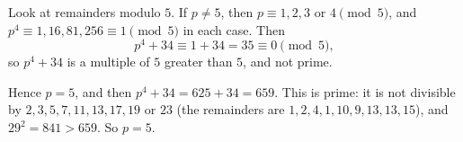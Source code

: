 Look at remainders modulo $5$. If $p\ne5$, then $p\equiv1,2,3$ or $4\pmod5$, and $p^4\equiv1,16,81,256\equiv1\pmod5$ in each case. Then
\[p^4+34\equiv1+34=35\equiv0\pmod5,\]
so $p^4+34$ is a multiple of $5$ greater than $5$, and not prime.

Hence $p=5$, and then $p^4+34=625+34=659$. This is prime: it is not divisible by $2,3,5,7,11,13,17,19$ or $23$ (the remainders are $1,2,4,1,10,9,13,13,15$), and $29^2=841>659$. So $p=\boxed{5}$.
